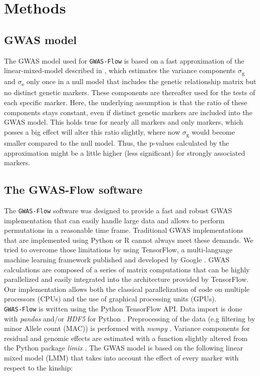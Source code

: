\section{Methods}

\subsection{GWAS model}
The GWAS model used for \texttt{GWAS-Flow} is based on a fast approximation of the
linear-mixed-model described in \cite{kang2010variance,Zhang2010}, which estimates the
variance components $\sigma$\textsubscript{g} and $\sigma$\textsubscript{e} only once in a
null model that includes the genetic relationship matrix but no distinct genetic
markers. These components are thereafter used for the tests of each specific marker. Here,
the underlying assumption is that the ratio of these components stays constant, even if
distinct genetic markers are included into the GWAS model. This holds true for nearly all
markers and only markers, which posses a big effect will alter this ratio slightly, where
now $\sigma$\textsubscript{g} would become smaller compared to the null model. Thus, the
p-values calculated by the approximation might be a little higher (less significant) for
strongly associated markers.

\subsection{The GWAS-Flow software}
The \texttt{GWAS-Flow} software was designed to provide a fast and robust GWAS
implementation that can easily handle large data and allows to perform permutations in a
reasonable time frame. Traditional GWAS implementations that are implemented using Python
\cite{van1995python} or R \cite{R} cannot always meet these demands. We tried to overcome
those limitations by using TensorFlow, a multi-language machine learning framework
published and developed by Google \cite{tensorflow2015-whitepaper}. GWAS calculations are
composed of a series of matrix computations that can be highly parallelized and easily
integrated into the architecture provided by TensorFlow. Our implementation allows both
the classical parallelization of code on multiple processors (CPUs) and the use of
graphical processing units (GPUs).\\
\texttt{GWAS-Flow} is written using the Python TensorFlow API. Data import is done with
\textit{pandas} \cite{mckinney-proc-scipy-2010} and/or \textit{HDF5} for Python
\cite{hdf5_2014}. Preprocessing of the data (e.g filtering by minor Allele count (MAC)) is
performed with \textit{numpy} \cite{oliphant2006guide}. Variance components for residual
and genomic effects are estimated with a function slightly altered from the Python package
\textit{limix} \cite{Lippert003905}. The GWAS model is based on the following linear mixed
model (LMM) that takes into account the effect of every marker with respect to the kinship:

